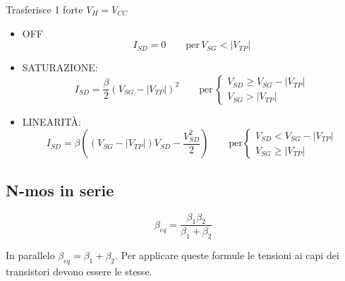 \documentclass{article}
\begin{document}
\begin{minipage}{0.2\textwidth}
\end{minipage}
\begin{minipage}{0.8\textwidth}
    Trasferisce 1 forte $V_H = V_{CC}$
    \begin{itemize}
        \item OFF
            \[ I_{SD} = 0 \qquad \text{per}\, V_{SG} < |V_{TP}| \]
        \item SATURAZIONE:
            \[ I_{SD} = \frac{\beta}{2}(V_{SG} - |V_{TP}|) ^2 \qquad \text{per}\,
                \begin{cases}
                    V_{SD} \ge V_{SG} - |V_{TP}|
                    \\
                    V_{SG} > |V_{TP}|
                \end{cases}
            \]
        \item LINEARITÀ:
            \[
                I_{SD} = \beta\left((V_{SG} - |V_{TP}|)V_{SD} - \frac{V_{SD}^2}{2}\right)
                \qquad\text{per}
                \begin{cases}
                    V_{SD} < V_{SG} - |V_{TP}|\\
                    V_{SG} \ge |V_{TP}|
                \end{cases}
            \]
    \end{itemize}
\end{minipage}

\newpage{}
\subsection*{N-mos in serie}
\begin{minipage}{0.2\textwidth}
\end{minipage}
\begin{minipage}{0.8\textwidth}
    \[
        \beta_{eq} = \frac{\beta_1 \beta_2}{\beta_1 + \beta_2}
    \]
\end{minipage}
In parallelo $\beta_{eq} = \beta_1 + \beta_2$. Per applicare queste formule le tensioni ai capi dei transistori devono essere le stesse.
\end{document}

